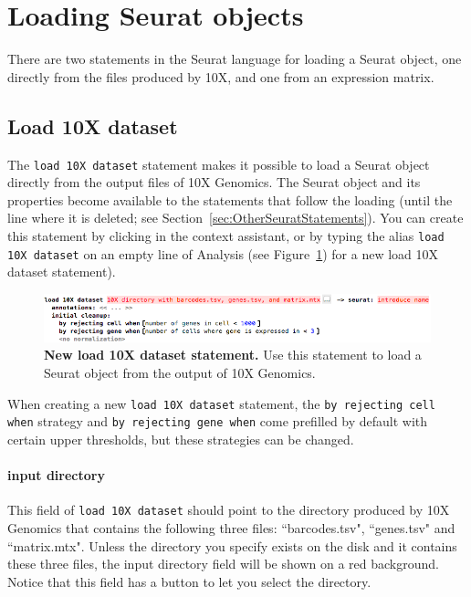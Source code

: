 \section{Loading Seurat objects}
There are two statements in the Seurat language for loading a Seurat object, one directly
from the files produced by 10X, and one from an expression matrix.

\subsection{Load 10X dataset}\label{subsec:Load10XDataset}
The \texttt{load 10X dataset} statement makes it possible to load a Seurat object directly
from the output files of 10X Genomics. The Seurat object and its properties become available
to the statements that follow the loading (until the line where it is deleted; see
Section~\ref{sec:OtherSeuratStatements}). You can create this statement by clicking
 in the context assistant, or by typing
the alias \texttt{load 10X dataset} on an empty line of Analysis (see Figure~\ref{fig:Load10XDataset})
for a new load 10X dataset statement).

\begin{figure}[h!tbp]
  \centering
  \includegraphics[width=\figWidthWide]{figures/Load10XDataset.png}
    \caption[New load 10X dataset statement.]{\textbf{New load 10X dataset statement.}
    Use this statement to load a Seurat object from the output of 10X Genomics.}
\label{fig:Load10XDataset}
\end{figure}

When creating a new \texttt{load 10X dataset} statement, the \texttt{by rejecting cell when}
strategy and \texttt{by rejecting gene when} come prefilled by default with certain upper
thresholds, but these strategies can be changed.

\paragraph{input directory} This field of \texttt{load 10X dataset} should point to
the directory produced by 10X Genomics that contains the following three files: ``barcodes.tsv",
``genes.tsv" and ``matrix.mtx". Unless the directory you specify exists on the disk and it contains
these three files, the input directory field will be shown on a red background. Notice that
this field has a button to let you select the directory.

